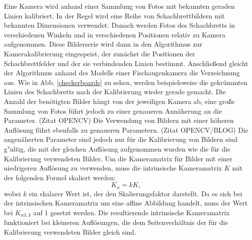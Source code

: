 \documentclass[arbeit=studie,oneside,BCOR=12mm]{ArbeitRST}
\begin{document}
Eine Kamera wird anhand einer Sammlung von Fotos mit bekannten geraden Linien
kalibriert. In der Regel wird eine Reihe von Schachbrettbildern mit bekannten
Dimensionen verwendet. Danach werden Fotos des Schachbretts in verschiedenen
Winkeln und in verschiedenen Positionen relativ zu Kamera aufgenommen. Diese Bilderserie
wird dann in den Algorithmus zur Kamerakalibrierung eingespeist, der zunächst
die Positionen der Schachbrettfelder und der sie verbindenden Linien bestimmt.
Anschließend gleicht der Algorithmus anhand des Modells einer Fischaugenkamera
die Verzeichnung aus. Wie in Abb. \ref{checkerboards} zu sehen, werden
beispielsweise die gekrümmten Linien des Schachbretts nach der Kalibrierung
wieder gerade gemacht. Die Anzahl der benötigten Bilder hängt von der
jeweiligen Kamera ab, eine große Sammlung von Fotos führt jedoch zu einer
genaueren Annäherung an die Parameter. (Zitat OPENCV) Die Verwendung von
Bildern mit einer höheren Auflösung führt ebenfalls zu genaueren Parametern.
(Zitat OPENCV/BLOG) Die angenäherten Parameter sind jedoch nur für die
Kalibrierung von Bildern sind g"ultig, die mit der gleichen Auflösung aufgenommen
wurden wie die für die Kalibrierung verwendeten Bilder. Um die Kameramatrix für
Bilder mit einer niedrigeren Auflösung zu verwenden, muss die intrinsische
Kameramatrix $K$ mit der folgenden Formel skaliert werden: 
\begin{equation} 
    K_n = k K, 
\end{equation} 
wobei $k$ ein skalarer Wert ist, der den Skalierungsfaktor darstellt. Da es
sich bei der intrinsischen Kameramatrix um eine affine Abbildung handelt, muss
der Wert bei $K_{n3, 3}$ auf 1 gesetzt werden. Die resultierende intrinsische
Kameramatrix funktioniert bei kleineren Auflösungen, die dem Seitenverhältnis
der für die Kalibrierung verwendeten Bilder gleich sind. 

\end{document}
